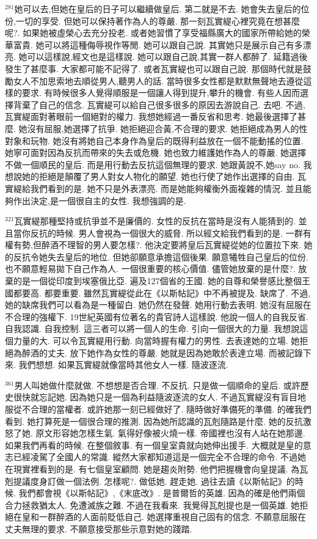 \documentclass{book}
\begin{document}
$^{281}$她可以去,但她在皇后的日子可以繼續做皇后.
第二就是不去.
她會失去皇后的位份,一切的享受.
但她可以保持著作為人的尊嚴.
那一刻瓦實緹心裡究竟在想甚麼呢?.
如果她被虛榮心去充分投老.
或者她習慣了享受福縣廣大的國家所帶給她的榮華富貴.
她可以將這種侮辱視作等閒.
她可以跟自己說.
其實她只是展示自己有多漂亮.
她可以這樣說,經文也是這樣說.
她可以跟自己說,其實一群人都醉了.
延籍過後發生了甚麼事.
大家都可能不記得了.
或者瓦實緹也可以跟自己說.
那個時代就是鼓勵女人不加思索地去順從男人,聽男人的話.
當時很多女性都是默默無聲地去遵從這樣的要求.
有時候很多人覺得順服是一個讓人得到提升,攀升的機會.
有些人因而選擇背棄了自己的信念.
瓦實緹可以給自己很多很多的原因去游說自己.
去吧.
不過,瓦實緹面對著眼前一個絕對的權力.
我想她經過一番反省和思考.
她最後選擇了甚麼.
她沒有屈服,她選擇了抗爭.
她拒絕迎合黃,不合理的要求.
她拒絕成為男人的性對象和玩物.
她沒有將她自己本身作為皇后的既得利益放在一個不能動搖的位置.
她寧可面對因為反抗而帶來的失去或危機.
她也致力維護她作為人的尊嚴.
她選擇不做一個順民的皇后.
而是用行動去反抗這個無理的要求.
她跟黃說不,她say no.
我想說她的拒絕是顛覆了男人對女人物化的願望.
她也行使了她作出選擇的自由.
瓦實緹給我們看到的是.
她不只是外表漂亮.
而是她能夠權衡外面複雜的情況.
並且能夠作出決定,是一個很自主的女性.
我想強調的是.

$^{321}$瓦實緹那種堅持或抗爭並不是廉價的.
女性的反抗在當時是沒有人能猜到的.
並且當你反抗的時候.
男人會視為一個很大的威脅.
所以經文給我們看到的是.
一群有權有勢,但醉酒不理智的男人要怎樣?.
他決定要將皇后瓦實緹從她的位置拉下來.
她的反抗令她失去皇后的地位.
但她卻願意承擔這個後果.
願意犧牲自己皇后的位份.
也不願意輕易拋下自己作為人.
一個很重要的核心價值.
儘管她放棄的是什麼?.
放棄的是一個從印度到埃塞俄比亞.
遍及127個省的王國.
她的自尊和榮譽感比整個王國都要高.
都要重要.
雖然瓦實緹從此在《以斯帖記》中不再被提及.
缺席了.
不過,她的缺席我們可以看為是一種留白.
她仍然在發聲.
她用行動去表明.
她沒有屈服在不合理的強權下.
19世紀英國有位著名的貴官詩人這樣說.
他說一個人的自我反省.
自我認識.
自我控制.
這三者可以將一個人的生命.
引向一個很大的力量.
我想說這個力量的大.
可以令瓦實緹用行動.
向當時握有權力的男性.
去表達她的立場.
她拒絕為醉酒的丈夫.
放下她作為女性的尊嚴.
她就是因為她敢於表達立場.
而被記錄下來.
我們想想.
如果瓦實緹就像當時其他女人一樣.
隨波逐流.

$^{361}$男人叫她做什麼就做.
不想想是否合理.
不反抗.
只是做一個順命的皇后.
或許歷史很快就忘記她.
因為她只是一個為利益隨波逐流的女人.
不過瓦實緹沒有盲目地服從不合理的當權者.
或許她那一刻已經做好了.
隨時做好準備死的準備.
的確我們看到.
她打算死是一個很合理的推測.
因為她所認識的瓦剋隨路是什麼.
她的反抗激怒了她.
原文形容她怎樣生氣.
氣得好像被火燒一樣.
帝國裡也沒有人站在她那邊.
如果我們再看的時候.
在整個敘事.
有一個皇室貴就向她伸出援手.
大概就是皇的意志已經凌駕了全國人的常識.
縱然大家都知道這是一個完全不合理的命令.
不過她在現實裡看到的是.
有七個皇室顧問.
她是趨炎附勢.
他們把握機會向皇提議.
為瓦剋提議度身訂做一個法例.
怎樣呢?.
做低她.
趕走她.
過往去讀《以斯帖記》的時候.
我們都會視《以斯帖記》,《末底改》.
是普爾哲的英雄.
因為的確是他們兩個合力拯救猶太人.
免遭滅族之難.
不過在我看來.
我覺得瓦剋提也是一個英雄.
她拒絕在皇和一群醉酒的人面前貶低自己.
她選擇重視自己固有的信念.
不願意屈服在丈夫無理的要求.
不願意接受那些示意對她的踐踏.
\end{document}
